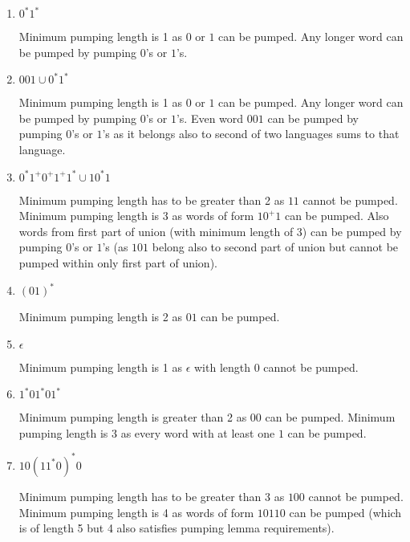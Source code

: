 \begin{enumerate}
\begin{enumerate}
                  \item $0^\ast 1^\ast$
                        
                        Minimum pumping length is 1 as $0$ or $1$ can be pumped. Any longer word can be pumped by pumping $0$'s or $1$'s. 
                        
                  \item $001 \cup 0^\ast 1^\ast$
                        
                        Minimum pumping length is 1 as $0$ or $1$ can be pumped. Any longer word can be pumped by pumping $0$'s or $1$'s. Even word $001$ can be pumped by pumping $0$'s or $1$'s as it belongs also to second of two languages sums to that language.
                        
                  \item $0^\ast 1^+ 0^+ 1^+ 1^\ast \cup 10^\ast1$
                        
                        Minimum pumping length has to be greater than 2 as $11$ cannot be pumped. 
                        Minimum pumping length is 3 as words of form $10^{+}1$ can be pumped. Also words from first part of union (with minimum length of 3) can be pumped by pumping $0$'s or $1$'s (as $101$ belong also to second part of union but cannot be pumped within only first part of union).
                        
                  \item $(01)^\ast$
                        
                        Minimum pumping length is 2 as $01$ can be pumped.
                        
                  \item $\epsilon$
                        
                        Minimum pumping length is 1 as $\epsilon$ with length 0 cannot be pumped.
                        
                  \item $1^\ast01^\ast01^\ast$
                        
                        Minimum pumping length is greater than 2 as $00$ can be pumped. Minimum pumping length is 3 as every word with at least one $1$ can be pumped.
                        
                  \item $10(11^\ast0)^\ast0$
                        
                        Minimum pumping length has to be greater than 3 as $100$ cannot be pumped. Minimum pumping length is 4 as words of form $10110$ can be pumped (which is of length 5 but 4 also satisfies pumping lemma requirements).
                        

\end{enumerate}
\end{enumerate}
